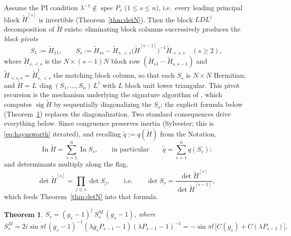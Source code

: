 \documentclass[11pt]{article}
\newtheorem{theorem}{Theorem}[section]
\theoremstyle{definition}
\newcommand{\Ht}{\widetilde H}
\begin{document}
Assume the PI condition $\lambda^{-1}\notin\operatorname{spec}P_s$
($1\le s\le n$), i.e.\ every leading principal block $\Ht^{[s]}$ is
invertible (Theorem~\ref{thm:detN}). Then the block $LDL^{\dagger}$
decomposition of $\Ht$ exists: eliminating block columns successively
produces the \emph{block pivots}
\[
S_1:=\Ht_{11},\qquad
S_s:=\Ht_{ss}-\Ht_{s,<s}\bigl(\Ht^{[s-1]}\bigr)^{-1}\Ht_{<s,s}
\quad(s\ge2),
\]
where $\Ht_{s,<s}$ is the $N\times(s-1)N$ block row
$(\Ht_{s1}\ \cdots\ \Ht_{s,s-1})$ and $\Ht_{<s,s}=\Ht_{s,<s}^{\dagger}$
the matching block column, so that each $S_s$ is $N\times N$
Hermitian; and $\Ht=L\,\operatorname{diag}(S_1,\dots,S_n)\,L^{\dagger}$
with $L$ block unit lower triangular. This pivot recursion is the mechanism
underlying the signature algorithm of \cite{N-KLM}, which computes
$\operatorname{sig}\Ht$ by sequentially diagonalizing the $S_s$;
the explicit formula below (Theorem~\ref{thm:pivot}) replaces the
diagonalization. Two standard consequences drive everything below.
Since congruence preserves inertia (Sylvester; this is
\eqref{eq:haynsworth} iterated), and recalling
$\widetilde q:=q(\Ht)$ from the Notation,
\[
\operatorname{In}\Ht=\sum_{s=1}^{n}\operatorname{In}S_s,
\qquad\text{in particular}\qquad
\widetilde q=\sum_{s=1}^{n}q(S_s);
\]
and determinants multiply along the flag,
\[
\det\Ht^{[s]}=\prod_{j\le s}\det S_j,
\qquad\text{i.e.}\qquad
\det S_s=\frac{\det\Ht^{[s]}}{\det\Ht^{[s-1]}},
\]
which feeds Theorem~\ref{thm:detN} into that formula.

\begin{theorem}\label{thm:pivot}
$S_s=(g_s-1)^{\dagger}\,S_s^{M}\,(g_s-1)$, where
\[
S_s^{M}
=2i\sin\pi l\,(g_s-1)^{-1}(\lambda g_sP_{s-1}-1)(\lambda P_{s-1}-1)^{-1}
=-\sin\pi l\,\bigl[C(g_s)+C(\lambda P_{s-1})\bigr].
\]
\end{theorem}
\end{document}
